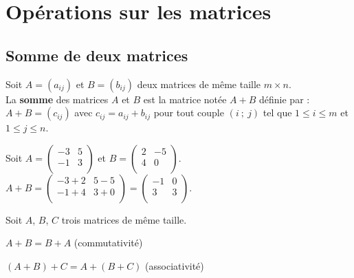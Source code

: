 \documentclass{cornouaille}
\begin{document}
\section{Opérations sur les matrices}

\subsection{Somme de deux matrices}

\begin{definition}
Soit $A=(a_{ij})$ et $B=(b_{ij})$ deux matrices de même taille $m\times n$.\\
La \textbf{somme} des matrices $A$ et $B$ est la matrice notée $A+B$ définie par :\\
$A+B=(c_{ij})$ avec $c_{ij}=a_{ij}+b_{ij}$ pour tout couple $(i~;~j)$ tel que $1\leqslant i\leqslant m$ et $1\leqslant j\leqslant n$.
\end{definition}

\begin{exemple}
Soit $A=\begin{pmatrix}
-3 & 5  \\
-1 & 3  \\
\end{pmatrix}$ et $B=\begin{pmatrix}
2 & -5  \\
4 & 0  \\
\end{pmatrix}$. $A+B=\begin{pmatrix}
-3+2 & 5-5  \\
-1+4 & 3+0  \\
\end{pmatrix}=\begin{pmatrix}
-1 & 0  \\
3 & 3  \\
\end{pmatrix}$.
\end{exemple}





\begin{propriete}
Soit $A$, $B$, $C$ trois matrices de même taille.
\begin{colitemize}{2}
\item $A+B=B+A$ (commutativité)
\item $(A+B)+C=A+(B+C)$ (associativité)
\end{colitemize}
\end{propriete}
\end{document}
